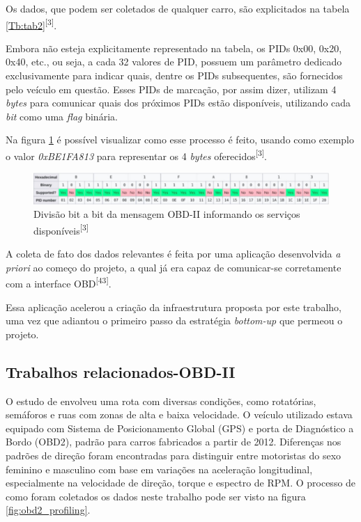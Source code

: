 Os dados, que podem ser coletados de qualquer carro, são explicitados na tabela \ref{Tb:tab2}\textsuperscript{[3]}.





Embora não esteja explicitamente representado na tabela, os PIDs 0x00, 0x20, 0x40, etc., ou seja, a cada 32 valores de PID, possuem um parâmetro dedicado exclusivamente para indicar quais, dentre os PIDs subsequentes, são fornecidos pelo veículo em questão. Esses PIDs de marcação, por assim dizer, utilizam 4 \textit{bytes} para comunicar quais dos próximos PIDs estão disponíveis, utilizando cada \textit{bit} como uma \textit{flag} binária. 

Na figura \ref{fig:bitwise_obd2} é possível visualizar como esse processo é feito, usando como exemplo o valor \textit{0xBE1FA813} para representar os 4 \textit{bytes} oferecidos\textsuperscript{[3]}.

\begin{figure}[hp]
    \centering
    
    \includegraphics[scale=0.42]{figures/tabela_dados_disponiveis.jpeg}
    
    \caption{Divisão bit a bit da mensagem OBD-II informando os serviços disponíveis\textsuperscript{[3]}}
    
    \label{fig:bitwise_obd2}
\end{figure}


A coleta de fato dos dados relevantes é feita por uma aplicação desenvolvida \textit{a priori} ao começo do projeto, a qual já era capaz de comunicar-se corretamente com a interface OBD\textsuperscript{[43]}.

Essa aplicação acelerou a criação da infraestrutura proposta por este trabalho, uma vez que adiantou o primeiro passo da estratégia \textit{bottom-up} que permeou o projeto.



\subsection{Trabalhos relacionados-OBD-II}

O estudo de \cite{Ahmadi-Assalemi, 2021} envolveu uma rota com diversas condições, como rotatórias, semáforos e ruas com zonas de alta e baixa velocidade.  O veículo utilizado estava equipado com Sistema de Posicionamento Global (GPS) e porta de Diagnóstico a Bordo (OBD2), padrão para carros fabricados a partir de 2012.  Diferenças nos padrões de direção foram encontradas para distinguir entre motoristas do sexo feminino e masculino com base em variações na aceleração longitudinal, especialmente na velocidade de direção, torque e espectro de RPM.
O processo de como foram coletados os dados neste trabalho pode ser visto na figura \ref{fig:obd2_profiling}.

